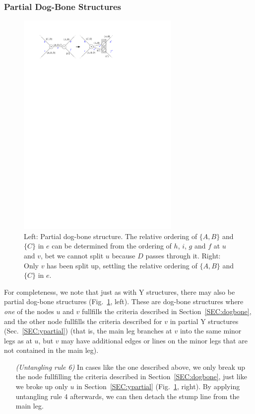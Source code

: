 \documentclass[format=acmsmall, review=false, screen=true]{acmart}
\begin{document}
\subsubsection{Partial Dog-Bone Structures}

\begin{figure}
  \includegraphics[width=0.7\textwidth, page=1]{figures/untangling/dogbone_partial.pdf}
  \caption{Left: Partial dog-bone structure. The relative ordering of $\{A, B\}$ and $\{C\}$ in $e$ can be determined from the ordering of $h$, $i$, $g$ and $f$ at $u$ and $v$, bet we cannot split $u$ because $D$ passes through it. Right: Only $v$ has been split up, settling the relative ordering of $\{A, B\}$ and $\{C\}$ in $e$.}  
  \label{FIG:untangle_dogbone_partial}
\end{figure}

For completeness, we note that just as with Y structures, there may also be partial dog-bone structures (Fig.~\ref{FIG:untangle_dogbone_partial}, left).
These are dog-bone structures where \emph{one} of the nodes $u$ and $v$ fullfills the criteria described in Section~\ref{SEC:dogbone}, and the other node fullfills the criteria described for $v$ in partial Y structures (Sec.~\ref{SEC:ypartial}) (that is, the main leg branches at $v$ into the same minor legs as at $u$, but $v$ may have additional edges or lines on the minor legs that are not contained in the main leg). 
\begin{enumerate}[parsep=0.5mm, wide, labelwidth=0mm, itemindent=2.3mm]
  \setlength\itemsep{1pt}
  \item[\emph{(Untangling rule 6)}] In cases like the one described above, we only break up the node fullfilling the criteria described in Section~\ref{SEC:dogbone}, just like we broke up only $u$ in Section~\ref{SEC:ypartial} (Fig.~\ref{FIG:untangle_dogbone_partial}, right). By applying untangling rule 4 afterwards, we can then detach the stump line from the main leg.
\end{enumerate}
\end{document}
